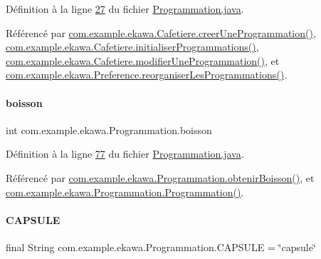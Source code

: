 Définition à la ligne \hyperlink{_programmation_8java_source_l00027}{27} du fichier \hyperlink{_programmation_8java_source}{Programmation.\+java}.



Référencé par \hyperlink{_cafetiere_8java_source_l00731}{com.\+example.\+ekawa.\+Cafetiere.\+creer\+Une\+Programmation()}, \hyperlink{_cafetiere_8java_source_l00692}{com.\+example.\+ekawa.\+Cafetiere.\+initialiser\+Programmations()}, \hyperlink{_cafetiere_8java_source_l00775}{com.\+example.\+ekawa.\+Cafetiere.\+modifier\+Une\+Programmation()}, et \hyperlink{_preference_8java_source_l00157}{com.\+example.\+ekawa.\+Preference.\+reorganiser\+Les\+Programmations()}.

\mbox{\label{classcom_1_1example_1_1ekawa_1_1_programmation_a625a85ed4d0b16f52382fd458e0e5657}} 
\paragraph{\texorpdfstring{boisson}{boisson}}
{\footnotesize\ttfamily int com.\+example.\+ekawa.\+Programmation.\+boisson\hspace{0.3cm}{\ttfamily [private]}}



Définition à la ligne \hyperlink{_programmation_8java_source_l00077}{77} du fichier \hyperlink{_programmation_8java_source}{Programmation.\+java}.



Référencé par \hyperlink{_programmation_8java_source_l00133}{com.\+example.\+ekawa.\+Programmation.\+obtenir\+Boisson()}, et \hyperlink{_programmation_8java_source_l00091}{com.\+example.\+ekawa.\+Programmation.\+Programmation()}.

\mbox{\label{classcom_1_1example_1_1ekawa_1_1_programmation_a44b5687d27784aed685c77cf79d419fd}} 
\paragraph{\texorpdfstring{C\+A\+P\+S\+U\+LE}{CAPSULE}}
{\footnotesize\ttfamily final String com.\+example.\+ekawa.\+Programmation.\+C\+A\+P\+S\+U\+LE = \char`\"{}capsule\char`\"{}\hspace{0.3cm}{\ttfamily [static]}}



